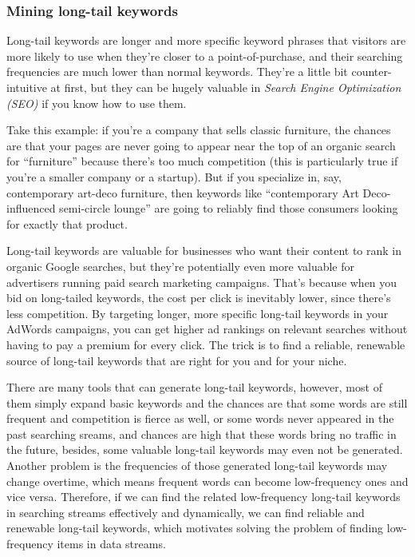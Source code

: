 \documentclass[conference]{IEEEtran}
\begin{document}
\subsubsection{Mining long-tail keywords}
Long-tail keywords are longer and more specific keyword phrases that visitors are more likely to use when they're closer to a point-of-purchase, and their searching frequencies are much lower than normal keywords. They're a little bit counter-intuitive at first, but they can be hugely valuable in \emph{Search Engine Optimization (SEO)} if you know how to use them.\par
Take this example: if you're a company that sells classic furniture, the chances are that your pages are never going to appear near the top of an organic search for ``furniture'' because there's too much competition (this is particularly true if you're a smaller company or a startup). But if you specialize in, say, contemporary art-deco furniture, then keywords like ``contemporary Art Deco-influenced semi-circle lounge'' are going to reliably find those consumers looking for exactly that product.\par
Long-tail keywords are valuable for businesses who want their content to rank in organic Google searches, but they're potentially even more valuable for advertisers running paid search marketing campaigns. That's because when you bid on long-tailed keywords, the cost per click is inevitably lower, since there's less competition. By targeting longer, more specific long-tail keywords in your AdWords campaigns, you can get higher ad rankings on relevant searches without having to pay a premium for every click. The trick is to find a reliable, renewable source of long-tail keywords that are right for you and for your niche.\par
There are many tools that can generate long-tail keywords, however, most of them simply expand basic keywords and the chances are that some words are still frequent and competition is fierce as well, or some words never appeared in the past searching sreams, and chances are high that these words bring no traffic in the future, besides, some valuable long-tail keywords may even not be generated. Another problem is the frequencies of those generated long-tail keywords may change overtime, which means frequent words can become low-frequency ones and vice versa. Therefore, if we can find the related low-frequency long-tail keywords in searching streams effectively and dynamically, we can find reliable and renewable long-tail keywords, which motivates solving the problem of finding low-frequency items in data streams.
\end{document}

